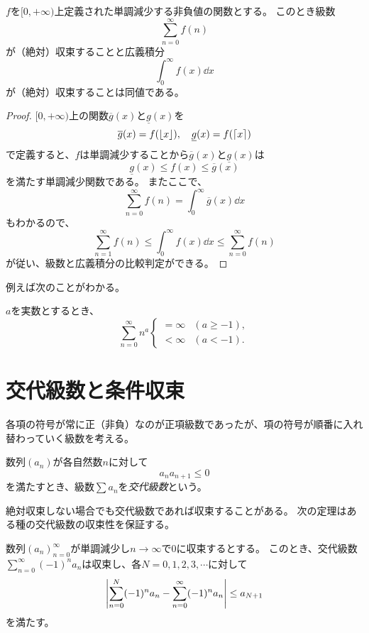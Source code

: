 \begin{theorem}[級数と広義積分の比較]
$f$を$[0, +\infty)$上定義された単調減少する非負値の関数とする。
このとき級数
$$
\sum_{n = 0}^\infty f(n)
$$
が（絶対）収束することと広義積分
$$
\int_0^\infty f(x)\dd{x}
$$
が（絶対）収束することは同値である。
\end{theorem}

\begin{proof}
$[0, +\infty)$上の関数$\overline{g}(x)$と$\underline{g}(x)$を
$$
\overline{g}(x) = f(\lfloor x\rfloor),
\quad \underline{g}(x) = f(\lceil x\rceil)
$$
で定義すると、$f$は単調減少することから$\overline{g}(x)$と$\underline{g}(x)$は
$$
\underline{g}(x) \le f(x) \le \overline{g}(x)
$$
を満たす単調減少関数である。
またここで、
$$
\sum_{n = 0}^\infty f(n) = \int_0^\infty \overline{g}(x)\dd{x}
$$
もわかるので、
$$
\sum_{n = 1}^\infty f(n) \le \int_0^\infty f(x)\dd{x} \le \sum_{n = 0}^\infty f(n)
$$
が従い、級数と広義積分の比較判定ができる。
\end{proof}

例えば次のことがわかる。

\begin{proposition}
$a$を実数とするとき、
$$
\sum_{n = 0}^\infty n^a
\begin{cases}
= \infty & (a \ge -1), \\
< \infty & (a < -1).
\end{cases}
$$
\end{proposition}

\section{交代級数と条件収束}

各項の符号が常に正（非負）なのが正項級数であったが、項の符号が順番に入れ替わっていく級数を考える。

\begin{definition}[交代級数]
数列$(a_n)$が各自然数$n$に対して
$$
a_n a_{n+1} \le 0
$$
を満たすとき、級数$\sum a_n$を\emph{交代級数}という。
\end{definition}

絶対収束しない場合でも交代級数であれば収束することがある。
次の定理はある種の交代級数の収束性を保証する。

\begin{theorem}[ライプニッツの判定法]
数列$(a_n)_{n = 0}^\infty$が単調減少し$n \to \infty$で$0$に収束するとする。
このとき、交代級数$\sum_{n = 0}^\infty (-1)^n a_n$は収束し、各$N = 0, 1, 2, 3, \cdots$に対して
$$
\abs{\sum_{n = 0}^N (-1)^n a_n-\sum_{n = 0}^\infty (-1)^n a_n} \le a_{N+1}
$$
を満たす。
\end{theorem}

